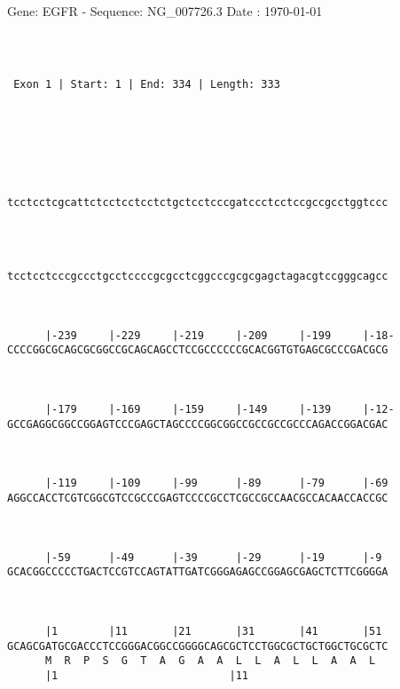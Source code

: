 \documentclass{article}
\begin{document}
\begin{center}
\begin{large}
 Gene: EGFR - Sequence: NG\_007726.3
 Date : \today
\end{large}
\end{center}
 \begin{Verbatim}



 Exon 1 | Start: 1 | End: 334 | Length: 333 





   
                                                            
tcctcctcgcattctcctcctcctctgctcctcccgatccctcctccgccgcctggtccc
                                                            
                                                            
   
                                                            
tcctcctcccgccctgcctccccgcgcctcggcccgcgcgagctagacgtccgggcagcc
                                                            
                                                            
   
      |-239     |-229     |-219     |-209     |-199     |-18-
CCCCGGCGCAGCGCGGCCGCAGCAGCCTCCGCCCCCCGCACGGTGTGAGCGCCCGACGCG
                                                            
                                                            
   
      |-179     |-169     |-159     |-149     |-139     |-12-
GCCGAGGCGGCCGGAGTCCCGAGCTAGCCCCGGCGGCCGCCGCCGCCCAGACCGGACGAC
                                                            
                                                            
   
      |-119     |-109     |-99      |-89      |-79      |-69
AGGCCACCTCGTCGGCGTCCGCCCGAGTCCCCGCCTCGCCGCCAACGCCACAACCACCGC
                                                            
                                                            
   
      |-59      |-49      |-39      |-29      |-19      |-9 
GCACGGCCCCCTGACTCCGTCCAGTATTGATCGGGAGAGCCGGAGCGAGCTCTTCGGGGA
                                                            
                                                            
   
      |1        |11       |21       |31       |41       |51 
GCAGCGATGCGACCCTCCGGGACGGCCGGGGCAGCGCTCCTGGCGCTGCTGGCTGCGCTC
      M  R  P  S  G  T  A  G  A  A  L  L  A  L  L  A  A  L  
      |1                           |11                     
   

\end{Verbatim}
\end{document}
